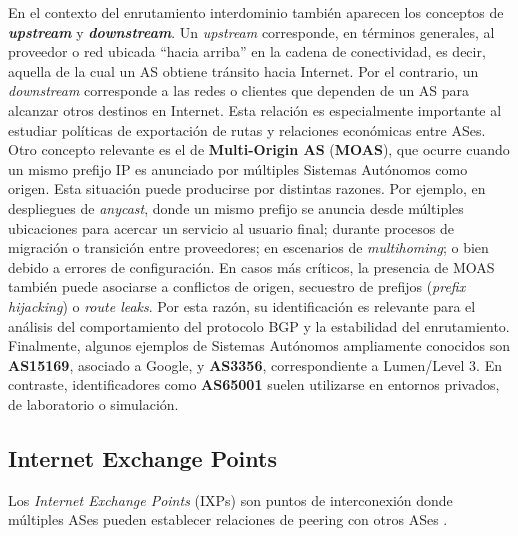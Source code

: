 En el contexto del enrutamiento interdominio también aparecen los conceptos de \textbf{\textit{upstream}} y \textbf{\textit{downstream}}. 
Un \textit{upstream} corresponde, en términos generales, al proveedor o red ubicada ``hacia arriba'' en la cadena de conectividad, es decir, 
aquella de la cual un AS obtiene tránsito hacia Internet. 
Por el contrario, un \textit{downstream} corresponde a las redes o clientes que dependen de un AS para alcanzar otros destinos en Internet. 
Esta relación es especialmente importante al estudiar políticas de exportación de rutas y relaciones económicas entre ASes.\\

Otro concepto relevante es el de \textbf{Multi-Origin AS} (\textbf{MOAS}), que ocurre cuando un mismo prefijo IP es anunciado por múltiples 
Sistemas Autónomos como origen. Esta situación puede producirse por distintas razones. Por ejemplo, en despliegues de \textit{anycast}, donde un 
mismo prefijo se anuncia desde múltiples ubicaciones para acercar un servicio al usuario final; durante procesos de migración o transición entre 
proveedores; en escenarios de \textit{multihoming}; o bien debido a errores de configuración. En casos más críticos, la presencia de MOAS también 
puede asociarse a conflictos de origen, secuestro de prefijos (\textit{prefix hijacking}) o \textit{route leaks}. Por esta razón, su identificación 
es relevante para el análisis del comportamiento del protocolo BGP y la estabilidad del enrutamiento.\\

Finalmente, algunos ejemplos de Sistemas Autónomos ampliamente conocidos son \textbf{AS15169}, asociado a Google, y \textbf{AS3356}, correspondiente 
a Lumen/Level 3. En contraste, identificadores como \textbf{AS65001} suelen utilizarse en entornos privados, de laboratorio o simulación.



\subsection{Internet Exchange Points} \label{sec:anexo_internet_exchange_points}
Los \textit{Internet Exchange Points} (IXPs) son puntos de interconexión donde múltiples ASes pueden establecer relaciones de peering con otros ASes \cite{Computer-Networking}.\\

